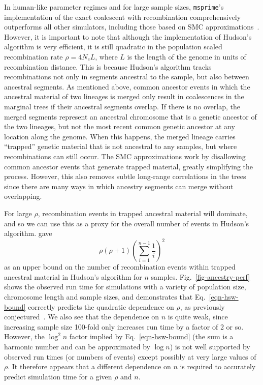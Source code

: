 \documentclass{article}
\newcommand{\msprime}[0]{\texttt{msprime}}
\begin{document}
In human-like parameter regimes and for large sample sizes,
\msprime's implementation of the
exact coalescent with recombination comprehensively outperforms
all other simulators, including those based on SMC
approximations~\citep{kelleher2016efficient}. However, it is important
to note that although the implementation of Hudson's algorithm is
very efficient, it is still quadratic in the population scaled recombination rate
$\rho = 4 N_e L$, where $L$ is the length of the genome in units of recombination distance.
This is because Hudson's algorithm tracks recombinations not only
in segments ancestral to the sample, but also between ancestral segments.
As mentioned above, common ancestor events in which the ancestral material
of two lineages is merged only result in coalescences in the marginal trees
if their ancestral segments overlap. If there is no overlap, the merged
segments represent an ancestral chromosome that is a genetic ancestor
of the two lineages, but not the most recent common genetic ancestor
at any location along the genome.
When this happens, the merged lineage carries ``trapped'' genetic material
that is not ancestral to any samples, but where recombinations can still occur.
The SMC approximations work by disallowing common ancestor events
that generate trapped material, greatly simplifying the process.
However, this also removes subtle long-range
correlations in the trees since there are many ways in which ancestry
segments can merge without overlapping.

For large $\rho$, recombination events in trapped ancestral material will
dominate, and so we can use this as a proxy for the overall number
of events in Hudson's algorithm.
\citet[Eq.~5.10]{hein2004gene} gave
\begin{equation}\label{eqn-hsw-bound}
\rho (\rho + 1) \left( \sum_{i=1}^{n-1} \frac{1}{i} \right)^2
\end{equation}
as an upper bound
on the number of recombination events within trapped ancestral material
in Hudson's algorithm for $n$ samples.
Fig.~\ref{fig-ancestry-perf} shows the observed run time for
simulations with a variety of population size, chromosome
length and sample sizes, and demonstrates that Eq.~\eqref{eqn-hsw-bound}
correctly predicts the quadratic dependence on $\rho$,
as previously conjectured~\citep[Fig.~2]{kelleher2016efficient}.
We also see that the dependence on $n$ is quite weak,
since increasing sample size 100-fold
only increases run time by a factor of 2 or so. However, the
$\log^2{n}$ factor implied by Eq.~\eqref{eqn-hsw-bound}
(the sum is a harmonic number and can be approximated by $\log{n}$)
is not well supported by observed run times (or numbers of events)
except possibly at very
large values of $\rho$. It therefore appears that a different dependence
on $n$ is required to accurately predict simulation time for a
given $\rho$ and $n$.
\end{document}
